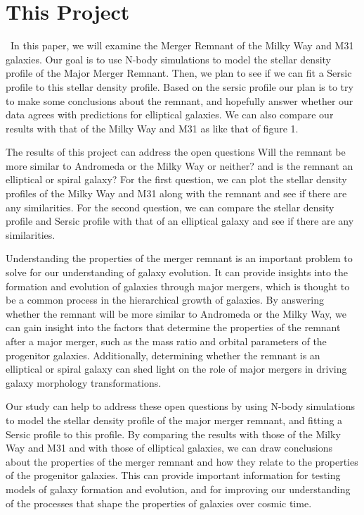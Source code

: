 \documentclass[preprint2, times]{aastex631}
\begin{document}
\section{This Project}\label{sec:style}\
In this paper, we will examine the Merger Remnant of the Milky Way and M31 galaxies. Our goal is to use N-body simulations to model the stellar density profile of the Major Merger Remnant. Then, we plan to see if we can fit a Sersic profile to this stellar density profile. Based on the sersic profile our plan is to try to make some conclusions about the remnant, and hopefully answer whether our data agrees with predictions for elliptical galaxies. We can also compare our results with that of the Milky Way and M31 as like that of figure 1.
\par
The results of this project can address the open questions Will the remnant be more similar to Andromeda or the Milky Way or neither? and is the remnant an elliptical or spiral galaxy? For the first question, we can plot the stellar density profiles of the Milky Way and M31 along with the remnant and see if there are any similarities. For the second question, we can compare the stellar density profile and Sersic profile with that of an elliptical galaxy and see if there are any similarities.
\par
Understanding the properties of the merger remnant is an important problem to solve for our understanding of galaxy evolution. It can provide insights into the formation and evolution of galaxies through major mergers, which is thought to be a common process in the hierarchical growth of galaxies. By answering whether the remnant will be more similar to Andromeda or the Milky Way, we can gain insight into the factors that determine the properties of the remnant after a major merger, such as the mass ratio and orbital parameters of the progenitor galaxies. Additionally, determining whether the remnant is an elliptical or spiral galaxy can shed light on the role of major mergers in driving galaxy morphology transformations.

Our study can help to address these open questions by using N-body simulations to model the stellar density profile of the major merger remnant, and fitting a Sersic profile to this profile. By comparing the results with those of the Milky Way and M31 and with those of elliptical galaxies, we can draw conclusions about the properties of the merger remnant and how they relate to the properties of the progenitor galaxies. This can provide important information for testing models of galaxy formation and evolution, and for improving our understanding of the processes that shape the properties of galaxies over cosmic time. 
\end{document}
